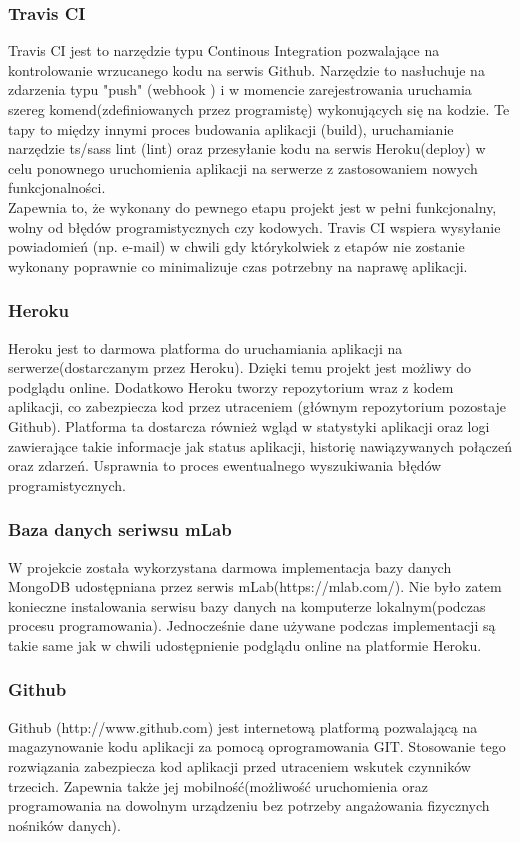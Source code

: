 \documentclass[eng,printmode]{mgr}
\begin{document}
\subsubsection{Travis CI}
Travis CI \cite{TravisCI} jest to narzędzie typu Continous Integration \cite{Keyword_CI} pozwalające na kontrolowanie wrzucanego kodu na serwis Github. Narzędzie to nasłuchuje na zdarzenia typu "push" (webhook \cite{Keyword_Webhook}) i w momencie zarejestrowania uruchamia szereg komend(zdefiniowanych przez programistę) wykonujących się na kodzie. Te tapy to między innymi proces budowania aplikacji (build), uruchamianie narzędzie ts/sass lint (lint) oraz przesyłanie kodu na serwis Heroku(deploy) w celu ponownego uruchomienia aplikacji na serwerze z zastosowaniem nowych funkcjonalności. \\
Zapewnia to, że wykonany do pewnego etapu projekt jest w pełni funkcjonalny, wolny od błędów programistycznych czy kodowych. Travis CI wspiera wysyłanie powiadomień (np. e-mail) w chwili gdy którykolwiek z etapów nie zostanie wykonany poprawnie co minimalizuje czas potrzebny na naprawę aplikacji.

\subsubsection{Heroku}
Heroku \cite{Heroku} jest to darmowa platforma do uruchamiania aplikacji na serwerze(dostarczanym przez Heroku). Dzięki temu projekt jest możliwy do podglądu online. Dodatkowo Heroku tworzy repozytorium wraz z kodem aplikacji, co zabezpiecza kod przez utraceniem (głównym repozytorium pozostaje Github). Platforma ta dostarcza również wgląd w statystyki aplikacji oraz logi zawierające takie informacje jak status aplikacji, historię nawiązywanych połączeń oraz zdarzeń. Usprawnia to proces ewentualnego wyszukiwania błędów programistycznych.

\subsubsection{Baza danych seriwsu mLab}
W projekcie została wykorzystana darmowa implementacja bazy danych MongoDB udostępniana przez serwis mLab(https://mlab.com/). Nie było zatem konieczne instalowania serwisu bazy danych na komputerze lokalnym(podczas procesu programowania). Jednocześnie dane używane podczas implementacji są takie same jak w chwili udostępnienie podglądu online na platformie Heroku.

\subsubsection{Github}
Github (http://www.github.com) jest internetową platformą pozwalającą na magazynowanie kodu aplikacji za pomocą oprogramowania GIT. Stosowanie tego rozwiązania zabezpiecza kod aplikacji przed utraceniem wskutek czynników trzecich. Zapewnia także jej mobilność(możliwość uruchomienia oraz programowania na dowolnym urządzeniu bez potrzeby angażowania fizycznych nośników danych).
\\
\\
\end{document}
